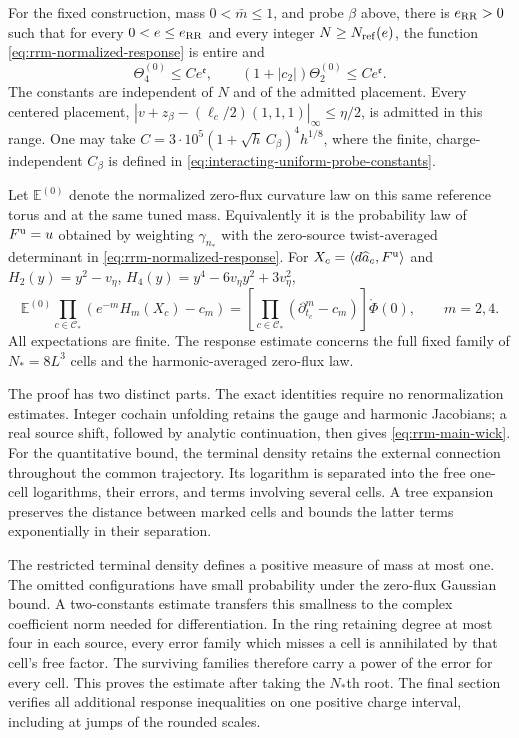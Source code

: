 \begin{theorem}\label{thm:rrm-main}
For the fixed construction, mass $0<\bar m\le1$, and probe $\beta$
above, there is $e_{\rm RR}>0$ such that for every
$0<e\le e_{\rm RR}$ and every integer $N\ge N_{\rm ref}(e)$,
the function \eqref{eq:rrm-normalized-response} is entire and
\begin{equation}\label{eq:rrm-main-bound}
 \Theta_4^{(0)}\le C e^{\mathfrak e},\qquad
 (1+|c_2|)\Theta_2^{(0)}\le C e^{\mathfrak e}.
\end{equation}
The constants are independent of $N$ and of the admitted placement.
Every centered placement,
$|v+z_\beta-(\ell_c/2)(1,1,1)|_\infty\le\eta/2$, is admitted
in this range. One may take
$C=3\cdot10^5(1+\sqrt h\,C_\beta)^4h^{1/8}$,
where the finite, charge-independent $C_\beta$ is defined in
\eqref{eq:interacting-uniform-probe-constants}.

Let $\mathbb E^{(0)}$ denote the normalized zero-flux curvature law
on this same reference torus and at the same tuned mass.
Equivalently it is the probability law of $F^{\rm u}=u$ obtained
by weighting $\gamma_{n_*}$ with the zero-source twist-averaged
determinant in \eqref{eq:rrm-normalized-response}.
For $X_c=\langle d\widehat a_c,F^{\rm u}\rangle$ and
$H_2(y)=y^2-v_\eta$, $H_4(y)=y^4-6v_\eta y^2+3v_\eta^2$,
\begin{equation}\label{eq:rrm-main-wick}
 \mathbb E^{(0)}\prod_{c\in\mathcal C_*}
             (e^{-m}H_m(X_c)-c_m)
       =\left[\prod_{c\in\mathcal C_*}
           (\partial_{t_c}^m-c_m)\right]\mathring\Phi(0),
 \qquad m=2,4.
\end{equation}
All expectations are finite. The response estimate concerns the full
fixed family of $N_*=8L^3$ cells and the harmonic-averaged zero-flux law.
\end{theorem}

The proof has two distinct parts. The exact identities require no
renormalization estimates. Integer cochain unfolding retains the gauge
and harmonic Jacobians; a real source shift, followed by analytic
continuation, then gives \eqref{eq:rrm-main-wick}.
For the quantitative bound, the terminal density retains the external
connection throughout the common trajectory. Its logarithm is separated
into the free one-cell logarithms, their errors, and terms involving
several cells. A tree expansion preserves the distance between marked
cells and bounds the latter terms exponentially in their separation.

The restricted terminal density defines a positive measure of mass at
most one. The omitted configurations have small probability under the
zero-flux Gaussian bound. A two-constants estimate transfers this
smallness to the complex coefficient norm needed for differentiation.
In the ring retaining degree at most four in each source, every error
family which misses a cell is annihilated by that cell's free factor.
The surviving families therefore carry a power of the error for every
cell. This proves the estimate after taking the $N_*$th root.
The final section verifies all additional response inequalities on one
positive charge interval, including at jumps of the rounded scales.

